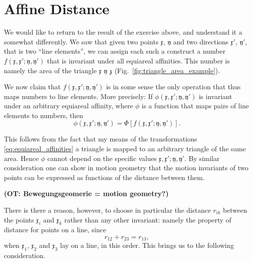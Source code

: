 \documentclass[11pt]{book} \usepackage{amssymb}
\newcommand{\myvec}[1]{\mathfrak{#1}}
\begin{document}
\section{Affine Distance}

We would like to return to the result of the exercise above, and understand it
a somewhat differently. We saw that given two points $\myvec{x}$, $\myvec{y}$
and two directions $\myvec{x}'$, $\myvec{y}'$, that is two ``line elements'', 
we can assign each such a construct a number 
$f(\myvec{x},\myvec{x}';\myvec{y},\myvec{y}')$ that is invariant under all
equiareal affinities. This number is namely the area of the triangle 
$\myvec{x}$ $\myvec{y}$ $\myvec{z}$ (Fig.~\ref{fig:triangle_area_example}).

We now claim that $f(\myvec{x},\myvec{x}';\myvec{y},\myvec{y}')$ is in some
sense the only operation that thus maps numbers to line elements. More 
precisely: If $\phi(\myvec{x},\myvec{x}';\myvec{y},\myvec{y}')$ is invariant
under an arbitrary equiareal affinity, where $\phi$ is a function that maps
pairs of line elements to numbers, then
$$ \phi(\myvec{x},\myvec{x}';\myvec{y},\myvec{y}') = \Phi\left[f(\myvec{x},\myvec{x}';\myvec{y},\myvec{y}')\right].$$

This follows from the fact that my means of the transformations 
\eqref{eq:equiareal_affinities} a triangle is mapped to an arbitrary triangle
of the same area. Hence $\phi$ cannot depend on the specific values
$\myvec{x},\myvec{x}';\myvec{y},\myvec{y}'$. By similar consideration one can
show in motion geometry that the motion invariants of two points can be 
expressed as functions of the distance between them.

{\bf (OT: Bewegungsgeomerie = motion geometry?)}

There is there a reason, however, to choose in particular the distance $r_{ik}$
between the points $\myvec{x}_i$ and $\myvec{x}_k$ rather than any other
invariant: namely the property of distance for points on a line, since
$$r_{12}+r_{23}=r_{13},$$
when $\myvec{x}_1$,  $\myvec{x}_2$ and $\myvec{x}_3$ lay on a line, in this 
order. This brings us to the following consideration.
 
\end{document}
